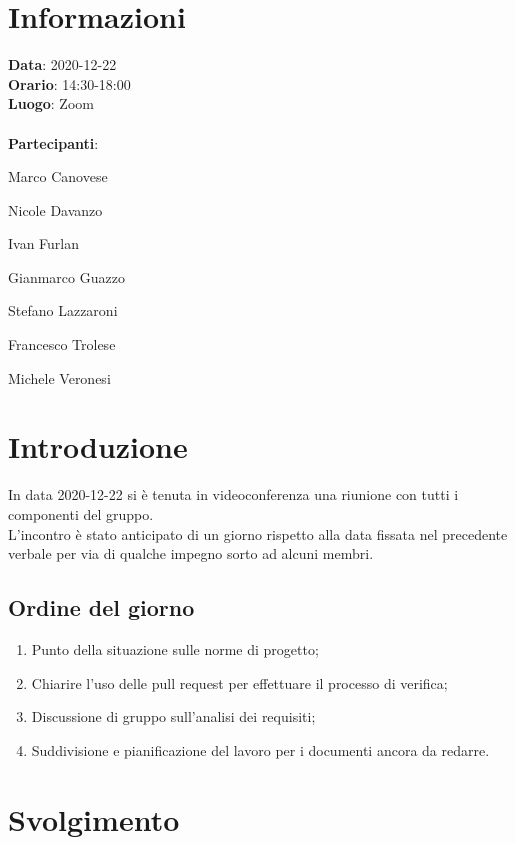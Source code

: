 \section{Informazioni}
\textbf{Data}: 2020-12-22\\
\textbf{Orario}: 14:30-18:00\\
\textbf{Luogo}: Zoom\\\\
\textbf{Partecipanti}:\begin{list}{*}{\setlength{\itemsep}{0cm}}
	\item Marco Canovese
	\item Nicole Davanzo
	\item Ivan Furlan
	\item Gianmarco Guazzo
	\item Stefano Lazzaroni
	\item Francesco Trolese
	\item Michele Veronesi
\end{list}

\section{Introduzione}
In data 2020-12-22 si è tenuta in videoconferenza una riunione con tutti i componenti del gruppo. \\
L'incontro è stato anticipato di un giorno rispetto alla data fissata nel precedente verbale per via di qualche impegno sorto ad alcuni membri. 

\subsection{Ordine del giorno}
\begin{enumerate}
    \item Punto della situazione sulle norme di progetto;
    \item Chiarire l'uso delle pull request per effettuare il processo di verifica;
    \item Discussione di gruppo sull'analisi dei requisiti;
    \item Suddivisione e pianificazione del lavoro per i documenti ancora da redarre.
\end{enumerate}

\section{Svolgimento}
